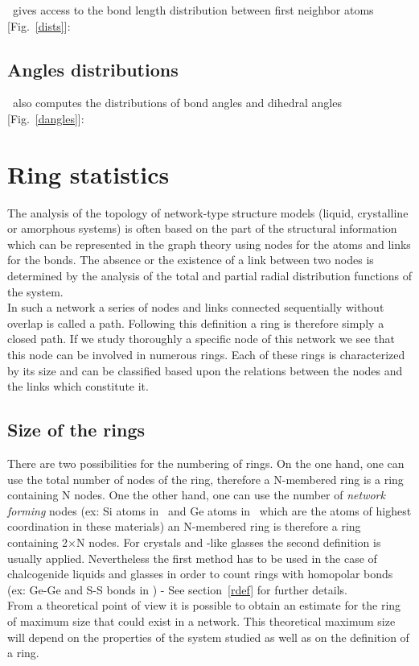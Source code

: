 \atomes\ gives access to the bond length distribution between first neighbor atoms [Fig.~\ref{dists}]: \\

\subsection{Angles distributions}

\atomes\ also computes the distributions of bond angles and dihedral angles [Fig.~\ref{dangles}]: \\
\danglesfig
\clearpage
\section{Ring statistics}
\label{rstat}

The analysis of the topology of network-type structure models (liquid, crystalline or amorphous systems) is often based on the part of the structural information which can be represented in the graph theory using nodes for the atoms and links for the bonds. 
The absence or the existence of a link between two nodes is determined by the analysis of the total and partial radial distribution functions of the system. \\
In such a network a series of nodes and links connected sequentially without overlap is called a path. 
Following this definition a ring is therefore simply a closed path. 
If we study thoroughly a specific node of this network we see that this node can be involved in numerous rings. 
Each of these rings is characterized by its size and can be classified based upon the relations between the nodes and the links which constitute it.

\subsection{Size of the rings}

There are two possibilities for the numbering of rings. 
On the one hand, one can use the total number of nodes of the ring, therefore a N-membered ring is a ring containing N nodes. 
One the other hand, one can use the number of {\em{network forming}} nodes (ex: Si atoms in \sio\ and Ge atoms in \ges\ which are the atoms of highest coordination in these materials) an N-membered ring is therefore a ring containing 2$\times$N nodes. 
For crystals and \sio-like glasses the second definition is usually applied. 
Nevertheless the first method has to be used in the case of chalcogenide liquids and glasses in order to count rings with homopolar bonds (ex: Ge-Ge and S-S bonds in \ges) - See section~\ref{rdef} for further details. \\
From a theoretical point of view it is possible to obtain an estimate for the ring of maximum size that could exist in a network.
This theoretical maximum size will depend on the properties of the system studied as well as on the definition of a ring. 


